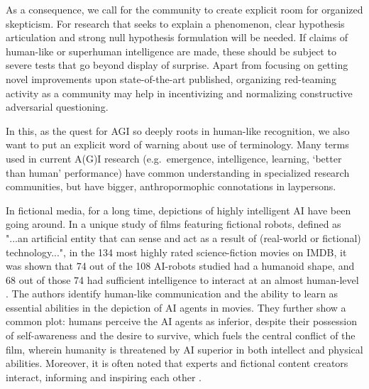 \documentclass{article}
\theoremstyle{plain}
\theoremstyle{definition}
\theoremstyle{remark}
\begin{document}
As a consequence, we call for the community to create explicit room for organized skepticism. For research that seeks to explain a phenomenon, clear hypothesis articulation and strong null hypothesis formulation will be needed. If claims of human-like or superhuman intelligence are made, these should be subject to severe tests that go beyond display of surprise. Apart from focusing on getting novel improvements upon state-of-the-art published, organizing red-teaming activity as a community may help in incentivizing and normalizing constructive adversarial questioning.

In this, as the quest for AGI so deeply roots in human-like recognition, we also want to put an explicit word of warning about use of terminology. Many terms used in current A(G)I research (e.g.\ emergence, intelligence, learning, `better than human' performance) have common understanding in specialized research communities, but have bigger, anthropormophic connotations in laypersons.

In fictional media, for a long time, depictions of highly intelligent AI have been going around. In a unique study of films featuring fictional robots, defined as "...an artificial entity that can sense and act as a result of (real-world or fictional) technology...", in the 134 most highly rated science-fiction movies on IMDB, it was shown that 74 out of the 108 AI-robots studied had a humanoid shape, and 68 out of those 74 had sufficient intelligence to interact at an almost human-level \cite{saffari2021does}. The authors identify human-like communication and the ability to learn as essential abilities in the depiction of AI agents in movies. They further show a common plot: humans perceive the AI agents as inferior, despite their possession of self-awareness and the desire to survive, which fuels the central conflict of the film, wherein humanity is threatened by AI superior in both intellect and physical abilities. Moreover, it is often noted that experts and fictional content creators interact, informing and inspiring each other \cite{saffari2021does, neri2020role}.
\end{document}
